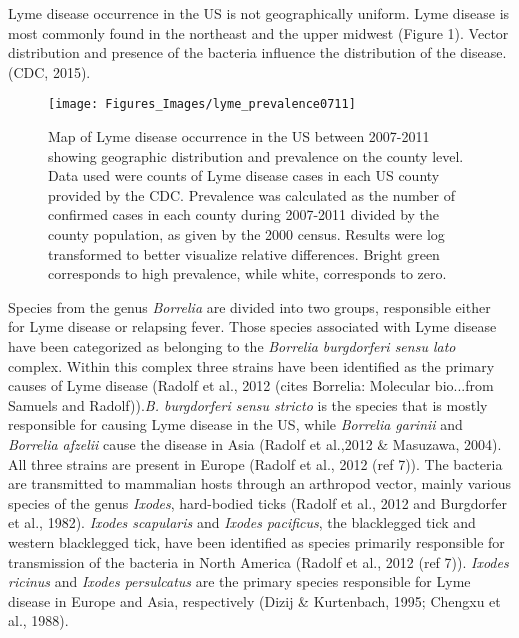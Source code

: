 \documentclass[12pt,twoside]{reedthesis}
\begin{document}
	Lyme disease occurrence in the US is not geographically uniform. Lyme disease is most commonly found in the northeast and the upper midwest (Figure 1).  Vector distribution and presence of the bacteria influence the distribution of the disease. (CDC, 2015).
		 	 	\begin{figure}[h]
		 	 		
		 	 		\centering
		 	 		\texttt{[image: Figures\_Images/lyme\_prevalence0711]}
		 	 		\caption[Geographic Distribution and Prevalence of Lyme Disease in the US]{Map of Lyme disease occurrence in the US between 2007-2011 showing geographic distribution and prevalence on the county level. Data used were counts of Lyme disease cases in each US county provided by the CDC. Prevalence was calculated as the number of confirmed cases in each county during 2007-2011 divided by the county population, as given by the 2000 census. Results were log transformed to better visualize relative differences. Bright green corresponds to high prevalence, while white, corresponds to zero.}
		 	 		\label{Lymemap}
		 	 	\end{figure}
 	 	
	
	 Species from the genus \textit{Borrelia} are divided into two groups, responsible either for Lyme disease or relapsing fever. Those species associated with Lyme disease have been categorized as belonging to the \textit{Borrelia burgdorferi sensu lato} complex. Within this complex three strains have been identified as the primary causes of Lyme disease (Radolf et al., 2012 (cites Borrelia: Molecular bio...from Samuels and Radolf)).\textit{B. burgdorferi sensu stricto} is the species that is mostly responsible for causing Lyme disease in the US, while \textit{Borrelia garinii} and \textit{Borrelia afzelii} cause the disease in Asia (Radolf et al.,2012 \& Masuzawa, 2004). All three strains are present in Europe (Radolf et al., 2012 (ref 7)). The bacteria are transmitted to mammalian hosts through an arthropod vector, mainly various species of the genus \textit{Ixodes}, hard-bodied ticks (Radolf et al., 2012 and Burgdorfer et al., 1982). \textit{Ixodes scapularis} and \textit{Ixodes pacificus}, the blacklegged tick and western blacklegged tick, have been identified as species primarily responsible for transmission of the bacteria in North America (Radolf et al., 2012 (ref 7)). \textit{Ixodes ricinus} and \textit{Ixodes persulcatus} are the primary species responsible for Lyme disease in Europe and Asia, respectively (Dizij \& Kurtenbach, 1995; Chengxu et al., 1988). 
	
\end{document}
